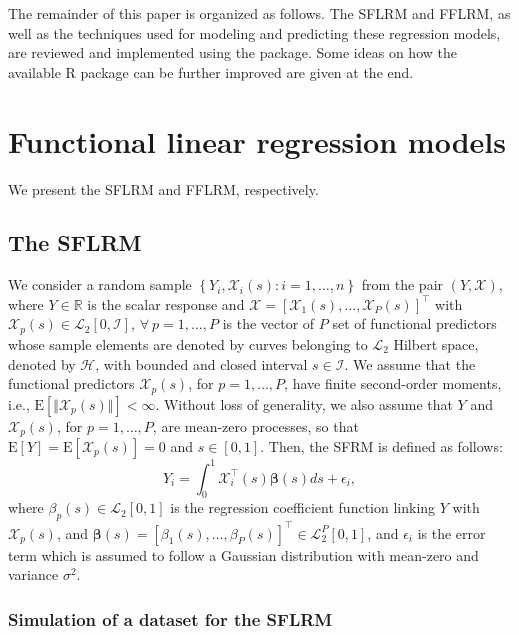 The remainder of this paper is organized as follows. The SFLRM and FFLRM, as well as the techniques used for modeling and predicting these regression models, are reviewed and implemented using the  package. Some ideas on how the available \textsf{R} package  can be further improved are given at the end.

\section{Functional linear regression models}

We present the SFLRM and FFLRM, respectively.

\subsection*{The SFLRM}

We consider a random sample $\left\lbrace Y_i, \bm{\mathcal{X}}_{i}(s): i = 1, \ldots, n \right\rbrace$ from the pair $( Y, \bm{\mathcal{X}} )$, where $Y \in \mathbb{R}$ is the scalar response and $\bm{\mathcal{X}} = [\mathcal{X}_1(s), \ldots, \mathcal{X}_P(s)]^\top$ with $\mathcal{X}_p(s) \in \mathcal{L}_2[0,\mathcal{I}]$, $\forall~p = 1, \ldots, P$ is the vector of $P$ set of functional predictors whose sample elements are denoted by curves belonging to $\mathcal{L}_2$ Hilbert space, denoted by $\mathcal{H}$, with bounded and closed interval $s \in \mathcal{I}$. We assume that the functional predictors $\mathcal{X}_p(s)$, for $p = 1, \ldots, P$, have finite second-order moments, i.e., $\text{E}[\Vert \mathcal{X}_p(s) \Vert] < \infty$. Without loss of generality, we also assume that $Y$ and $\mathcal{X}_p(s)$, for $p = 1, \ldots, P$, are mean-zero processes, so that $\text{E}[Y] = \text{E}[\mathcal{X}_p(s)] = 0$ and $s \in [0,1]$. Then, the SFRM is defined as follows:
\begin{equation}\label{eq:sof}
Y_i = \int_0^1 \bm{\mathcal{X}}_i^\top(s) \bm{\beta}(s) ds + \epsilon_i,
\end{equation}
where $\beta_p(s) \in \mathcal{L}_2[0,1]$ is the regression coefficient function linking $Y$ with $\mathcal{X}_p(s)$, and $\bm{\beta}(s) = [ \beta_1(s), \ldots, \beta_P(s) ]^\top \in \mathcal{L}_2^P[0,1]$, and $\epsilon_i$ is the error term which is assumed to follow a Gaussian distribution with mean-zero and variance $\sigma^2$.

\subsubsection*{Simulation of a dataset for the SFLRM}

